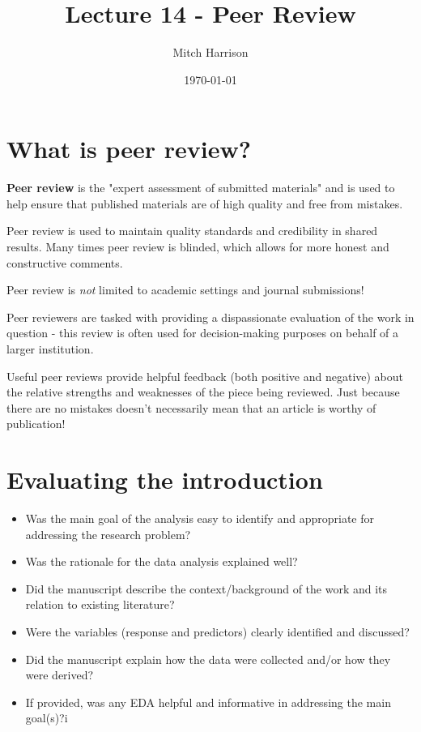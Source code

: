\documentclass[titlepage, 12pt, leqno]{article}
\title{\Huge{Lecture 14 - Peer Review}}
\author{\large{Mitch Harrison}}
\date{\today}
\begin{document}
\setlength{\parskip}{1\baselineskip}
\setlength{\parindent}{15pt}
\maketitle
\tableofcontents
\newpage


\section{What is peer review?}

\begin{definition}
    \textbf{Peer review} is the "expert assessment of submitted materials" and is
    used to help ensure that published materials are of high quality and free
    from mistakes.
\end{definition}

Peer review is used to maintain quality standards and credibility in shared
results. Many times peer review is blinded, which allows for more honest and
constructive comments.

\begin{note}
    Peer review is \textit{not} limited to academic settings and journal
    submissions!
\end{note}

Peer reviewers are tasked with providing a dispassionate evaluation of the work
in question - this review is often used for decision-making purposes on behalf of
a larger institution. 

Useful peer reviews provide helpful feedback (both positive and negative) about
the relative strengths and weaknesses of the piece being reviewed. Just because
there are no mistakes doesn't necessarily mean that an article is worthy of
publication!

\pagebreak
\section{Evaluating the introduction}
\begin{itemize}
    \item Was the main goal of the analysis easy to identify and appropriate for
        addressing the research problem?
    \item Was the rationale for the data analysis explained well?
    \item Did the manuscript describe the context/background of the work and
        its relation to existing literature?
    \item Were the variables (response and predictors) clearly identified and
        discussed?
    \item Did the manuscript explain how the data were collected and/or how they
        were derived?
    \item If provided, was any EDA helpful and informative in addressing the main
        goal(s)?i
\end{itemize}
\end{document}
